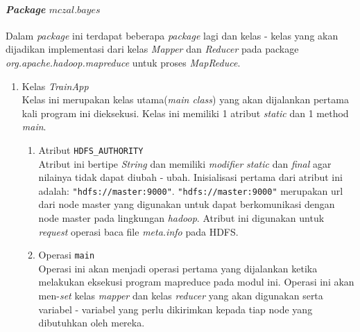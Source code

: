 \paragraph{\textit{Package} $mczal.bayes$}
Dalam \textit{package} ini terdapat beberapa \textit{package} lagi dan kelas - kelas yang akan dijadikan implementasi dari kelas \textit{Mapper} dan \textit{Reducer} pada package \textit{org.apache.hadoop.mapreduce} untuk proses \textit{MapReduce}.
\begin{enumerate}
	\item{Kelas \textit{TrainApp}}\\
	Kelas ini merupakan kelas utama(\textit{main class}) yang akan dijalankan pertama kali program ini dieksekusi. Kelas ini memiliki 1 atribut \textit{static} dan 1 method \textit{main}.
	\begin{enumerate}
		\item Atribut \verb|HDFS_AUTHORITY| \\
		Atribut ini bertipe \textit{String} dan memiliki \textit{modifier} \textit{static} dan \textit{final} agar nilainya tidak dapat diubah - ubah. Inisialisasi pertama dari atribut ini adalah: \verb|"hdfs://master:9000"|. \verb|"hdfs://master:9000"| merupakan url dari node master yang digunakan untuk dapat berkomunikasi dengan node master pada lingkungan \textit{hadoop}. Atribut ini digunakan untuk \textit{request} operasi baca file \textit{meta.info} pada HDFS.
		
		\item Operasi \verb|main|\\
		Operasi ini akan menjadi operasi pertama yang dijalankan ketika melakukan eksekusi program mapreduce pada modul ini. Operasi ini akan men-\textit{set} kelas \textit{mapper} dan kelas \textit{reducer} yang akan digunakan serta variabel - variabel yang perlu dikirimkan kepada tiap node yang dibutuhkan oleh mereka.
	\end{enumerate}


\end{enumerate}
